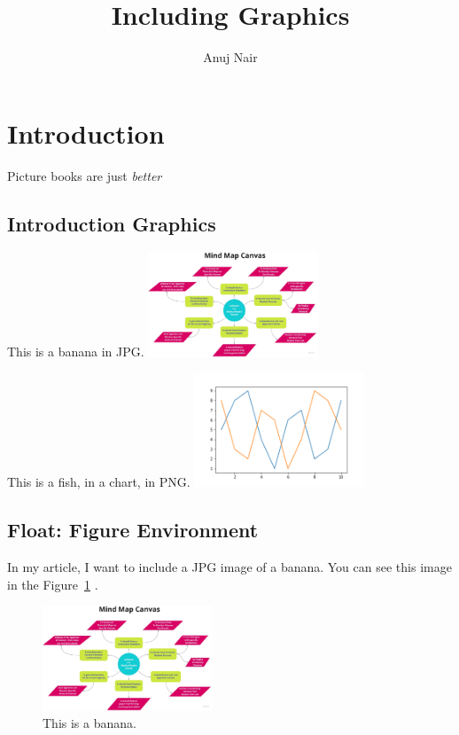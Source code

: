 \documentclass{proc}
\title{Including Graphics}
\author{Anuj Nair}
\date{}
\begin{document}
\maketitle

\section{Introduction}

Picture books are just \emph{better}

\subsection{Introduction Graphics}

  This is a banana in JPG.
  \includegraphics[width=2in]{me.jpg}

  This is a fish, in a chart, in PNG.
				\includegraphics[width=2in]{graph.png}


   

\subsection{Float: Figure Environment}

  In my article, I want to include a JPG image of a banana. You can see this image in the Figure~\ref{fig:banana} .
  \begin{figure}[htbp]
    \begin{center}
				\includegraphics[width=2in]{me.jpg}
        \caption{This is a banana.}
        \label{fig:banana}
    \end{center}
  \end{figure}
  
\end{document}
